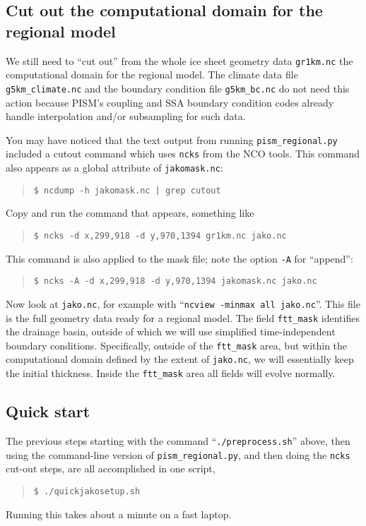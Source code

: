 \subsection*{Cut out the computational domain for the regional model}
We still need to ``cut out'' from the whole ice sheet geometry data \verb|gr1km.nc| the computational domain for the regional model.  The climate data file \texttt{g5km_climate.nc} and the boundary condition file \texttt{g5km_bc.nc} do not need this action because PISM's coupling and SSA boundary condition codes already handle interpolation and/or subsampling for such data.

You may have noticed that the text output from running \texttt{pism_regional.py} included a cutout command which uses \texttt{ncks} from the NCO tools.  This command also appears as a global attribute of \texttt{jakomask.nc}:
\begin{quote}\small
\begin{verbatim}
$ ncdump -h jakomask.nc | grep cutout
\end{verbatim}
\normalsize\end{quote}
Copy and run the command that appears, something like
\begin{quote}\small
\begin{verbatim}
$ ncks -d x,299,918 -d y,970,1394 gr1km.nc jako.nc
\end{verbatim}
\normalsize\end{quote}
This command is also applied to the mask file; note the option \verb|-A| for ``append'':
\begin{quote}\small
\begin{verbatim}
$ ncks -A -d x,299,918 -d y,970,1394 jakomask.nc jako.nc
\end{verbatim}
\normalsize\end{quote}
Now look at \verb|jako.nc|, for example with ``\verb|ncview -minmax all jako.nc|''.  This file is the full geometry data ready for a regional model.  The field \verb|ftt_mask| identifies the drainage basin, outside of which we will use simplified time-independent boundary conditions.  Specifically, outside of the \verb|ftt_mask| area, but within the computational domain defined by the extent of \verb|jako.nc|, we will essentially keep the initial thickness.  Inside the \verb|ftt_mask| area all fields will evolve normally.

\subsection*{Quick start}
The previous steps starting with the command ``\verb|./preprocess.sh|'' above, then using the command-line version of \verb|pism_regional.py|, and then doing the \verb|ncks| cut-out steps, are all accomplished in one script,
\begin{quote}\small
\begin{verbatim}
$ ./quickjakosetup.sh
\end{verbatim}
\normalsize\end{quote}
Running this takes about a minute on a fast laptop.

